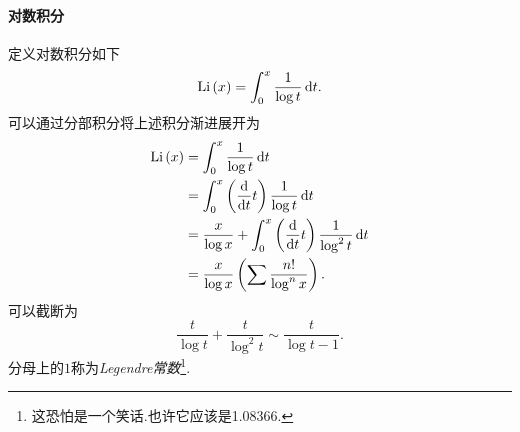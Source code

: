 \documentclass[UTF-8]{ctexart}
\begin{document}
  \paragraph{对数积分}定义对数积分如下
  \newcommand{\Li}{\mathrm{Li}}
  \[ \Li\pare{x} = \intu{x}{\frac{1}{\log t}}{t}. \]
  可以通过分部积分将上述积分渐进展开为
  \begin{align*}
    \Li\pare{x} &= \intu{x}{\frac{1}{\log t}}{t} \\
    &= \intu{x}{\pare{\edt{}t}\frac{1}{\log t}}{t} \\
    &= \frac{x}{\log x} + \intu{x}{\pare{\edt{}t}\frac{1}{\log^2 t}}{t}\\
    &= \frac{x}{\log x} \pare{\sum \frac{n!}{\log^n x}}.
  \end{align*}
  可以截断为
  \[ \frac{t}{\log t} + \frac{t}{\log^2 t} \sim \frac{t}{\log t - 1}. \]
  分母上的$1$称为\emph{Legendre常数}\footnote{这恐怕是一个笑话.也许它应该是1.08366.}.
\end{document}
